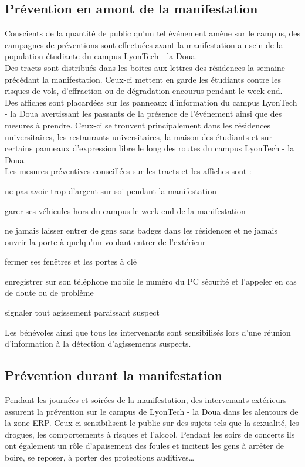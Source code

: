 \documentclass[hidelinks, paper=a4, fontsize=13pt]{report}
\begin{document}
\subsection{Prévention en amont de la manifestation}
Conscients de la quantité de public qu’un tel événement amène sur le campus, des campagnes de préventions sont effectuées avant la manifestation au sein de la population étudiante du campus LyonTech - la Doua.\\

Des tracts sont distribués dans les boites aux lettres des résidences la semaine précédant la manifestation. Ceux-ci mettent en garde les étudiants contre les risques de vols, d’effraction ou de dégradation encourus pendant le week-end.\\

Des affiches sont placardées sur les panneaux d’information du campus LyonTech - la Doua avertissant les passants de la présence de l’événement ainsi que des mesures à prendre. Ceux-ci se trouvent principalement dans les résidences universitaires, les restaurants universitaires, la maison des étudiants et sur certains panneaux d’expression libre le long des routes du campus LyonTech - la Doua.\\

Les mesures préventives conseillées sur les tracts et les affiches sont :
\begin{list}{•}{}
\item ne pas avoir trop d’argent sur soi pendant la manifestation
\item garer ses véhicules hors du campus le week-end de la manifestation
\item ne jamais laisser entrer de gens sans badges dans les résidences et ne jamais ouvrir la porte à quelqu’un voulant entrer de l’extérieur
\item fermer ses fenêtres et les portes à clé
\item enregistrer sur son téléphone mobile le numéro du PC sécurité et l’appeler en cas de doute ou de problème
\item signaler tout agissement paraissant suspect
\end{list}
Les bénévoles ainsi que tous les intervenants sont sensibilisés lors d’une réunion d’information à la détection d’agissements suspects.
\subsection{Prévention durant la manifestation}
Pendant les journées et soirées de la manifestation, des intervenants extérieurs assurent la prévention sur le campus de LyonTech - la Doua dans les alentours de la zone ERP. Ceux-ci sensibilisent le public sur des sujets tels que la sexualité, les drogues, les comportements à risques et l’alcool.
Pendant les soirs de concerts ils ont également un rôle d’apaisement des foules et incitent les gens à arrêter de boire, se reposer, à porter des protections auditives…\\
\end{document}

